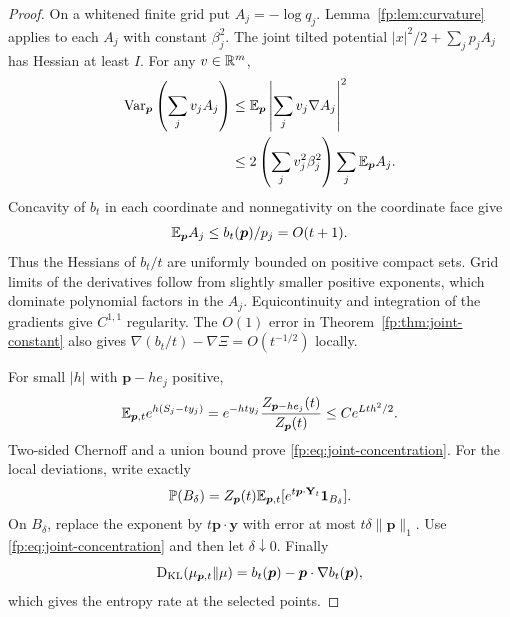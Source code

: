 \begin{proof}
On a whitened finite grid put $A_j=-\log q_j$. Lemma~\ref{fp:lem:curvature} applies to each $A_j$ with constant $\beta_j^2$. The joint tilted potential $|x|^2/2+\sum_jp_jA_j$ has Hessian at least $I$. For any $v\in\mathbb R^m$,
\begin{align*}
 \operatorname{Var}_{\boldsymbol p}\left(\sum_jv_jA_j\right)
 &\le\mathbb E_{\boldsymbol p}\left|\sum_jv_j\nabla A_j\right|^2\\
 &\le2\left(\sum_jv_j^2\beta_j^2\right)
         \sum_j\mathbb E_{\boldsymbol p}A_j.
\end{align*}
Concavity of $b_t$ in each coordinate and nonnegativity on the coordinate face give
\[
 \mathbb E_{\boldsymbol p}A_j\le b_t(\boldsymbol p)/p_j=O(t+1).
\]
Thus the Hessians of $b_t/t$ are uniformly bounded on positive compact sets. Grid limits of the derivatives follow from slightly smaller positive exponents, which dominate polynomial factors in the $A_j$. Equicontinuity and integration of the gradients give $C^{1,1}$ regularity. The $O(1)$ error in Theorem~\ref{fp:thm:joint-constant} also gives $\nabla(b_t/t)-\nabla\Xi=O(t^{-1/2})$ locally.

For small $|h|$ with $\boldsymbol p-he_j$ positive,
\[
 \mathbb E_{\boldsymbol p,t}e^{h(S_j-ty_j)}
 =e^{-hty_j}\frac{Z_{\boldsymbol p-he_j}(t)}{Z_{\boldsymbol p}(t)}
 \le Ce^{Lth^2/2}.
\]
Two-sided Chernoff and a union bound prove \eqref{fp:eq:joint-concentration}. For the local deviations, write exactly
\[
 \mathbb P(B_\delta)
 =Z_{\boldsymbol p}(t)
   \mathbb E_{\boldsymbol p,t}[e^{t\boldsymbol p\cdot\mathbf Y_t}\mathbf 1_{B_\delta}].
\]
On $B_\delta$, replace the exponent by $t\boldsymbol p\cdot\mathbf y$ with error at most $t\delta\|\boldsymbol p\|_1$. Use \eqref{fp:eq:joint-concentration} and then let $\delta\downarrow0$. Finally
\[
 \operatorname{D_{\mathrm{KL}}}(\mu_{\boldsymbol p,t}\Vert\mu)
 =b_t(\boldsymbol p)-\boldsymbol p\cdot\nabla b_t(\boldsymbol p),
\]
which gives the entropy rate at the selected points.
\end{proof}

